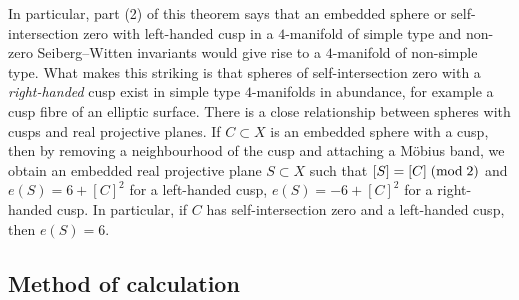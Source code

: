 \documentclass{amsart}
\theoremstyle{definition}
\theoremstyle{remark}
\numberwithin{equation}{section}
\begin{document}
In particular, part (2) of this theorem says that an embedded sphere or self-intersection zero with left-handed cusp in a $4$-manifold of simple type and non-zero Seiberg--Witten invariants would give rise to a $4$-manifold of non-simple type. What makes this striking is that spheres of self-intersection zero with a {\em right-handed} cusp exist in simple type $4$-manifolds in abundance, for example a cusp fibre of an elliptic surface. There is a close relationship between spheres with cusps and real projective planes. If $C \subset X$ is an embedded sphere with a cusp, then by removing a neighbourhood of the cusp and attaching a M\"obius band, we obtain an embedded real projective plane $S \subset X$ such that $[S] = [C] \; ({\rm mod} \; 2)$ and $e(S) = 6 + [C]^2$ for a left-handed cusp, $e(S) = -6 + [C]^2$ for a right-handed cusp. In particular, if $C$ has self-intersection zero and a left-handed cusp, then $e(S) = 6$.


\subsection{Method of calculation}
\end{document}
